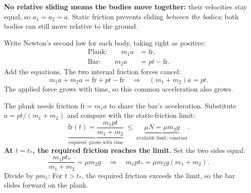 \begin{solutionframe}
  \par
  \textbf{No relative sliding means the bodies move together:}
  their velocities stay equal, so \(a_1=a_2=a\).
  Static friction prevents sliding \emph{between the bodies};
  both bodies can still move relative to the ground.

  \medskip
  Write Newton's second law for each body, taking right as positive:
  \[
    \begin{aligned}
      \text{Plank:}\qquad m_1a&=\mathrm{fr},\\[.3em]
      \text{Bar:}\qquad m_2a&=pt-\mathrm{fr}.
    \end{aligned}
  \]
  Add the equations. The two internal friction forces cancel:
  \[
    m_1a+m_2a=\mathrm{fr}+pt-\mathrm{fr}
    \quad\Rightarrow\quad (m_1+m_2)a=pt.
  \]
  The applied force grows with time, so this common acceleration also grows.
\end{solutionframe}

\begin{solutionframe}
  \par
  The plank needs friction \(\mathrm{fr}=m_1a\) to share the bar's acceleration.
  Substitute \(a=pt/(m_1+m_2)\) and compare with the static-friction limit:
  \[
    \underbrace{\mathrm{fr}(t)=\frac{m_1pt}{m_1+m_2}}_{\text{required; grows with time}}
    \ \le\ \underbrace{\mu N=\mu m_2g}_{\text{available limit; constant}}.
  \]
  \textbf{At \(t=t_*\), the required friction reaches the limit.}
  Set the two sides equal:
  \[
    \frac{m_1pt_*}{m_1+m_2}=\mu m_2g
    \quad\Rightarrow\quad m_1pt_*=\mu m_2g(m_1+m_2).
  \]
  Divide by \(pm_1\):
  For \(t>t_*\), the required friction exceeds the limit, so the bar slides forward on the plank.
\end{solutionframe}

